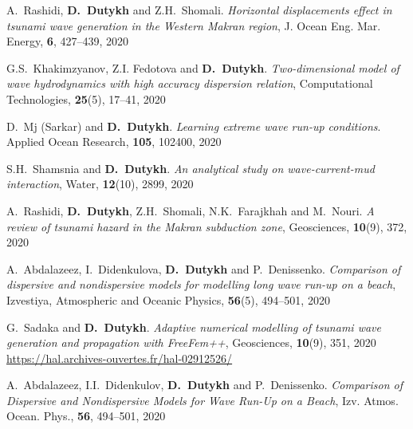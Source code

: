 \begin{etaremune}
  
  \item A.~Rashidi, \textbf{D.~Dutykh} and Z.H.~Shomali. \textit{Horizontal displacements effect in tsunami wave generation in the Western Makran region}, J. Ocean Eng. Mar. Energy, \textbf{6}, 427--439, 2020 %
  
  \item G.S.~Khakimzyanov, Z.I. Fedotova and \textbf{D.~Dutykh}. \textit{Two-dimensional model of wave hydrodynamics with high accuracy dispersion relation}, Computational Technologies, \textbf{25}(5), 17--41, 2020 %
  
  \item D.~Mj (Sarkar) and \textbf{D.~Dutykh}. \textit{Learning extreme wave run-up conditions}. Applied Ocean Research, \textbf{105}, 102400, 2020 %
  
  \item S.H.~Shamsnia and \textbf{D.~Dutykh}. \textit{An analytical study on wave-current-mud interaction}, Water, \textbf{12}(10), 2899, 2020 %
  
  \item A.~Rashidi, \textbf{D.~Dutykh}, Z.H.~Shomali, N.K.~Farajkhah and M.~Nouri. \textit{A review of tsunami hazard in the Makran subduction zone}, Geosciences, \textbf{10}(9), 372, 2020 %
  
  \item A.~Abdalazeez, I.~Didenkulova, \textbf{D.~Dutykh} and P.~Denissenko. \textit{Comparison of dispersive and nondispersive models for modelling long wave run-up on a beach}, Izvestiya, Atmospheric and Oceanic Physics, \textbf{56}(5), 494--501, 2020 %
  
  \item G.~Sadaka and \textbf{D.~Dutykh}. \textit{Adaptive numerical modelling of tsunami wave generation and propagation with FreeFem++}, Geosciences, \textbf{10}(9), 351, 2020 \\ %
  \url{https://hal.archives-ouvertes.fr/hal-02912526/}
  
  \item A.~Abdalazeez, I.I.~Didenkulov, \textbf{D.~Dutykh} and P.~Denissenko. \textit{Comparison of Dispersive and Nondispersive Models for Wave Run-Up on a Beach}, Izv. Atmos. Ocean. Phys., \textbf{56}, 494--501, 2020 %
  

\end{etaremune}
